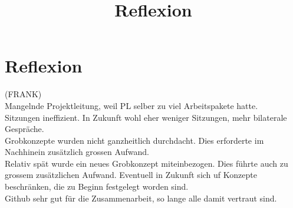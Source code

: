 \documentclass[12pt]{article}
\title{Reflexion}
\begin{document}
\section*{Reflexion}

(FRANK)\\
Mangelnde Projektleitung, weil PL selber zu viel Arbeitspakete hatte.\\
Sitzungen ineffizient. In Zukunft wohl eher weniger Sitzungen, mehr bilaterale Gespräche.\\
Grobkonzepte wurden nicht ganzheitlich durchdacht. Dies erforderte im Nachhinein zusätzlich grossen Aufwand.\\
Relativ spät wurde ein neues Grobkonzept miteinbezogen. Dies führte auch zu grossem zusätzlichen Aufwand. Eventuell in Zukunft sich uf Konzepte beschränken, die zu Beginn festgelegt worden sind.\\
Github sehr gut für die Zusammenarbeit, so lange alle damit vertraut sind.\\
\end{document}
